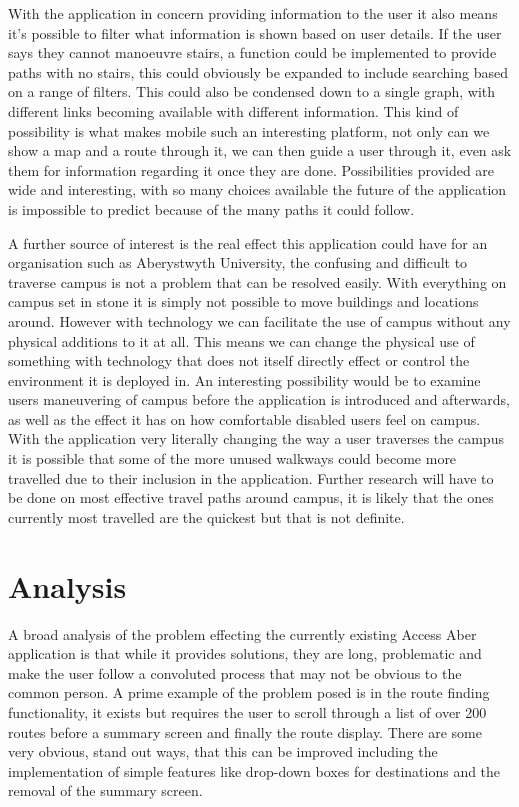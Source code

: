 With the application in concern providing information to the user it also means it's possible to filter what information is shown based on user details. If the user says they cannot manoeuvre stairs, a function could be  implemented to provide paths with no stairs, this could obviously be expanded to include searching based on a range of filters. This could also be condensed down to a single graph, with different links becoming available with different information. This kind of possibility is what makes mobile such an interesting platform, not only can we show a map and a route through it, we can then guide a user through it, even ask them for information regarding it once they are done. Possibilities provided are wide and interesting, with so many choices available the future of the application is impossible to predict because of the many paths it could follow.

A further source of interest is the real effect this application could have for an organisation such as Aberystwyth University, the confusing and difficult to traverse campus is not a problem that can be resolved easily. With everything on campus set in stone it is simply not possible to move buildings and locations around. However with technology we can facilitate the use of campus without any physical additions to it at all. This means we can change the physical use of something with technology that does not itself directly effect or control the environment it is deployed in. An interesting possibility would be to examine users maneuvering of campus before the application is introduced and afterwards, as well as the effect it has on how comfortable disabled users feel on campus. With the application very literally changing the way a user traverses the campus it is possible that some of the more unused walkways could become more travelled due to their inclusion in the application. Further research will have to be done on most effective travel paths around campus, it is likely that the ones currently most travelled are the quickest but that is not definite. 
\section{Analysis}
A broad analysis of the problem effecting the currently existing Access Aber\cite{aa} application is that while it provides solutions, they are long, problematic and make the user follow a convoluted process that may not be obvious to the common person. A prime example of the problem posed is in the route finding functionality, it exists but requires the user to scroll through a list of over 200 routes before a summary screen and finally the route display. There are some very obvious, stand out ways, that this can be improved including the implementation of simple features like drop-down boxes for destinations and the removal of the summary screen. 

